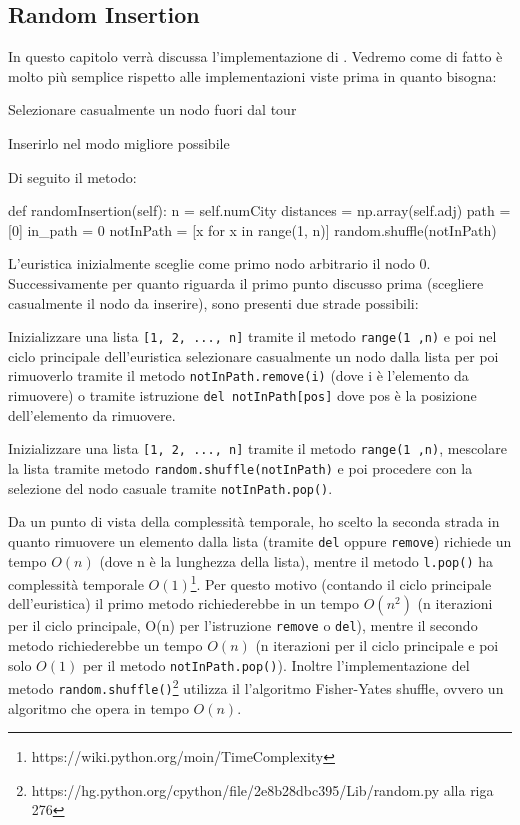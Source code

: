 \documentclass[a4paper,12pt]{report}
\begin{document}
\subsection{Random Insertion}
In questo capitolo verrà discussa l'implementazione di . Vedremo come di fatto è molto più semplice rispetto alle implementazioni viste prima in quanto bisogna:
\begin{legal}
  \item Selezionare casualmente un nodo fuori dal tour
  \item Inserirlo nel modo migliore possibile
\end{legal}
Di seguito il metodo:
\begin{python}
def randomInsertion(self):
  n = self.numCity
  distances = np.array(self.adj)
  path = [0]
  in_path = {0}
  notInPath = [x for x in range(1, n)]
  random.shuffle(notInPath)
\end{python}
L'euristica inizialmente sceglie come primo nodo arbitrario il nodo 0. Successivamente 
per quanto riguarda il primo punto discusso prima (scegliere casualmente il nodo da inserire), sono presenti due strade possibili:
\begin{legal}
  \item Inizializzare una lista \lstinline![1, 2, ..., n]! tramite il metodo \lstinline!range(1 ,n)! e poi nel ciclo principale dell'euristica selezionare casualmente un nodo dalla lista per poi rimuoverlo tramite il metodo \lstinline!notInPath.remove(i)! (dove i è l'elemento da rimuovere) o tramite istruzione \lstinline!del notInPath[pos]! dove pos è la posizione dell'elemento da rimuovere.
  \item Inizializzare una lista \lstinline![1, 2, ..., n]! tramite il metodo \lstinline!range(1 ,n)!, mescolare la lista tramite metodo \lstinline!random.shuffle(notInPath)! e poi procedere con la selezione del nodo casuale tramite \lstinline!notInPath.pop()!.
\end{legal}
Da un punto di vista della complessità temporale, ho scelto la seconda strada in quanto rimuovere un elemento dalla lista (tramite \lstinline!del! oppure \lstinline!remove!) richiede un tempo $O(n)$ (dove n è la lunghezza della lista), mentre il metodo \lstinline!l.pop()! ha complessità temporale $O(1)$\footnote{https://wiki.python.org/moin/TimeComplexity}. Per questo motivo (contando il ciclo principale dell'euristica) il primo metodo richiederebbe in un tempo $O(n^2)$ (n iterazioni per il ciclo principale, O(n) per l'istruzione \lstinline!remove! o \lstinline!del!), mentre il secondo metodo richiederebbe un tempo $O(n)$ (n iterazioni per il ciclo principale e poi solo $O(1)$ per il metodo \lstinline!notInPath.pop()!). Inoltre l'implementazione del metodo \lstinline!random.shuffle()!\footnote{https://hg.python.org/cpython/file/2e8b28dbc395/Lib/random.py alla riga 276} utilizza il l'algoritmo Fisher-Yates shuffle\cite{knuthart}, ovvero un algoritmo che opera in tempo $O(n)$.
\end{document}
